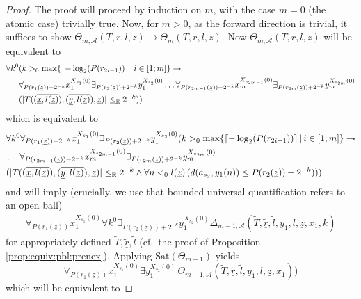 \documentclass[11pt]{amsart}
\theoremstyle{definition}
\theoremstyle{remark}
\DeclarePairedDelimiter{\ceil}{\lceil}{\rceil}
\def\RR{\mathbb{R}}
\begin{document}
\begin{proof}
The proof will proceed by induction on $m$, with the case $m=0$ (the atomic case) trivially true. Now, for $m>0$, as the forward direction is trivial, it suffices to show $ \Theta_{m,\mathcal{A}}(T,\underline{r},l,\underline{z}) \to \Theta_m(T,\underline{r},l,\underline{z})$. Now $\Theta_{m,\mathcal{A}}(T,\underline{r},l,\underline{z})$ will be equivalent to 
\begin{align*}
    \forall k^0 &( k>_0\max\{\ceil{-\log_2(P(r_{2i-1}))}\,|\, i \in [1;m]\} \to\\ &\forall_{P(r_1(\underline{z}))-2^{-k}} x_1^{X_{s_1}(0)} \exists_{P(r_2(\underline{z}))+2^{-k}} y_1^{X_{s_2}(0)} \ldots \forall_{P(r_{2m-1}(\underline{z}))-2^{-k}} x_m^{X_{s_{2m-1}}(0)}\exists_{P(r_{2m}(\underline{z}))+2^{-k}} y_m^{X_{s_{2m}}(0)}\\&(|T((\overline{\underline{x},l(\underline{z})}),(\overline{\underline{y},l(\underline{z})}),\underline{z})|\le_\RR 2^{-k}))
\end{align*}
which is equivalent to 
\begin{align*}
    &\forall k^0\forall_{P(r_1(\underline{z}))-2^{-k}} x_1^{X_{s_1}(0)} \exists_{P(r_2(\underline{z}))+2^{-k}} y_1^{X_{s_2}(0)}( k>_0\max\{\ceil{-\log_2(P(r_{2i-1}))}\,|\, i \in [1;m]\} \to\\ & \ldots \forall_{P(r_{2m-1}(\underline{z}))-2^{-k}} x_m^{X_{s_{2m-1}}(0)}\exists_{P(r_{2m}(\underline{z}))+2^{-k}} y_m^{X_{s_{2m}}(0)}\\&(|T((\overline{\underline{x},l(\underline{z})}),(\overline{\underline{y},l(\underline{z})}),\underline{z})|\le_\RR 2^{-k}\land \forall n<_0l(\underline{z})\,(d(a_{s_2},y_1(n))\le P(r_2(\underline{z}))+2^{-k})))
\end{align*}
and will imply (crucially, we use that bounded universal quantification refers to an open ball)
\begin{align*}
     \forall_{P(r_1(\underline{z}))} x_1^{X_{s_1}(0)} \forall k^0\exists_{P(r_2(\underline{z}))+2^{-k}} y_1^{X_{s_2}(0)} \Delta_{m-1,\mathcal{A}}(\tilde{T},\underline{\tilde{r}},\tilde{l},y_1,l,\underline{z},x_1,k)
\end{align*}
for appropriately defined $\tilde{T},\underline{\tilde{r}}, \tilde{l}$ (cf.\ the proof of Proposition \ref{prop:equiv:pbl:prenex}). Applying  $\mathrm{Sat}(\Theta_{m-1})$ yields 
\[
\forall_{P(r_1(\underline{z}))} x_1^{X_{s_1}(0)} \exists y_1^{X_{s_2}(0)} \, \Theta_{m-1,\mathcal{A}}(\tilde{T},\underline{\tilde{r}},\tilde{l},y_1,l,\underline{z},x_1))
\]
which will be equivalent to 

\end{proof}
\end{document}

